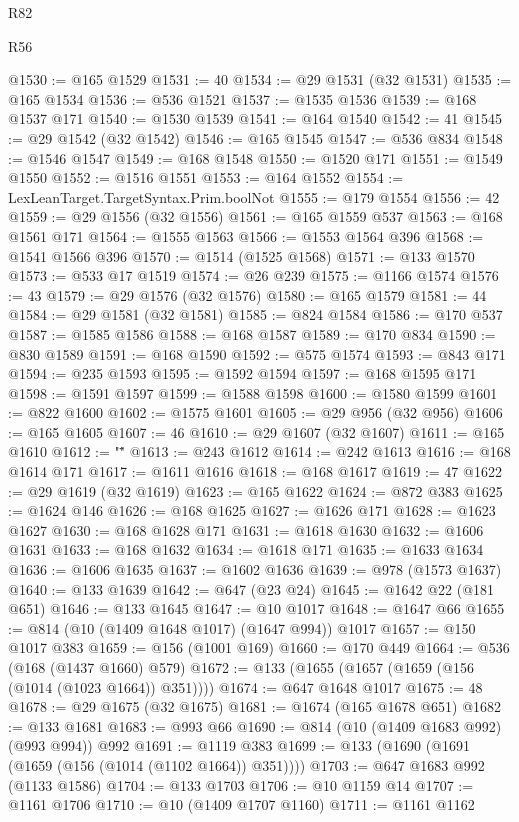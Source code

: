 \begin{lexlean}{R82}
\begin{lexlean}{R56}
\begin{coremodule}
{{{{{{{{{{{{{{{{{{{{{{{{{{{{{{{{{{{{{{{{{{{{{{{{{{{{{{{{{{{{{{{{{{{{{{{{{{{{{{{{{{{{{{{{{{{{{{{{{{{{{{{{{{{{{{{{{{{{{{{{{{{{{{{{{{{{{{{{{{{{{{{{{{{{{{{{{{{{{{{{{{{{{{{{{{{{{{{{{{{{{{{{{{{{{{{{{{{{{{{{{{{{{{{{{{{@1530 := @165 @1529
@1531 := 40
@1534 := @29 @1531 (@32 @1531)
@1535 := @165 @1534
@1536 := @536 @1521
@1537 := @1535 @1536
@1539 := @168 @1537 @171
@1540 := @1530 @1539
@1541 := @164 @1540
@1542 := 41
@1545 := @29 @1542 (@32 @1542)
@1546 := @165 @1545
@1547 := @536 @834
@1548 := @1546 @1547
@1549 := @168 @1548
@1550 := @1520 @171
@1551 := @1549 @1550
@1552 := @1516 @1551
@1553 := @164 @1552
@1554 := LexLeanTarget.TargetSyntax.Prim.boolNot
@1555 := @179 @1554
@1556 := 42
@1559 := @29 @1556 (@32 @1556)
@1561 := @165 @1559 @537
@1563 := @168 @1561 @171
@1564 := @1555 @1563
@1566 := @1553 @1564 @396
@1568 := @1541 @1566 @396
@1570 := @1514 (@1525 @1568)
@1571 := @133 @1570
@1573 := @533 @17 @1519
@1574 := @26 @239
@1575 := @1166 @1574
@1576 := 43
@1579 := @29 @1576 (@32 @1576)
@1580 := @165 @1579
@1581 := 44
@1584 := @29 @1581 (@32 @1581)
@1585 := @824 @1584
@1586 := @170 @537
@1587 := @1585 @1586
@1588 := @168 @1587
@1589 := @170 @834
@1590 := @830 @1589
@1591 := @168 @1590
@1592 := @575 @1574
@1593 := @843 @171
@1594 := @235 @1593
@1595 := @1592 @1594
@1597 := @168 @1595 @171
@1598 := @1591 @1597
@1599 := @1588 @1598
@1600 := @1580 @1599
@1601 := @822 @1600
@1602 := @1575 @1601
@1605 := @29 @956 (@32 @956)
@1606 := @165 @1605
@1607 := 46
@1610 := @29 @1607 (@32 @1607)
@1611 := @165 @1610
@1612 := "\""
@1613 := @243 @1612
@1614 := @242 @1613
@1616 := @168 @1614 @171
@1617 := @1611 @1616
@1618 := @168 @1617
@1619 := 47
@1622 := @29 @1619 (@32 @1619)
@1623 := @165 @1622
@1624 := @872 @383
@1625 := @1624 @146
@1626 := @168 @1625
@1627 := @1626 @171
@1628 := @1623 @1627
@1630 := @168 @1628 @171
@1631 := @1618 @1630
@1632 := @1606 @1631
@1633 := @168 @1632
@1634 := @1618 @171
@1635 := @1633 @1634
@1636 := @1606 @1635
@1637 := @1602 @1636
@1639 := @978 (@1573 @1637)
@1640 := @133 @1639
@1642 := @647 (@23 @24)
@1645 := @1642 @22 (@181 @651)
@1646 := @133 @1645
@1647 := @10 @1017
@1648 := @1647 @66
@1655 := @814 (@10 (@1409 @1648 @1017) (@1647 @994)) @1017
@1657 := @150 @1017 @383
@1659 := @156 (@1001 @169)
@1660 := @170 @449
@1664 := @536 (@168 (@1437 @1660) @579)
@1672 := @133 (@1655 (@1657 (@1659 (@156 (@1014 (@1023 @1664)) @351))))
@1674 := @647 @1648 @1017
@1675 := 48
@1678 := @29 @1675 (@32 @1675)
@1681 := @1674 (@165 @1678 @651)
@1682 := @133 @1681
@1683 := @993 @66
@1690 := @814 (@10 (@1409 @1683 @992) (@993 @994)) @992
@1691 := @1119 @383
@1699 := @133 (@1690 (@1691 (@1659 (@156 (@1014 (@1102 @1664)) @351))))
@1703 := @647 @1683 @992 (@1133 @1586)
@1704 := @133 @1703
@1706 := @10 @1159 @14
@1707 := @1161 @1706
@1710 := @10 (@1409 @1707 @1160)
@1711 := @1161 @1162
}}}}}}}}}}}}}}}}}}}}}}}}}}}}}}}}}}}}}}}}}}}}}}}}}}}}}}}}}}}}}}}}}}}}}}}}}}}}}}}}}}}}}}}}}}}}}}}}}}}}}}}}}}}}}}}}}}}}}}}}}}}}}}}}}}}}}}}}}}}}}}}}}}}}}}}}}}}}}}}}}}}}}}}}}}}}}}}}}}}}}}}}}}}}}}}}}}}}}}}}}}}}}}}}}}}
\end{coremodule}
\end{lexlean}
\end{lexlean}
